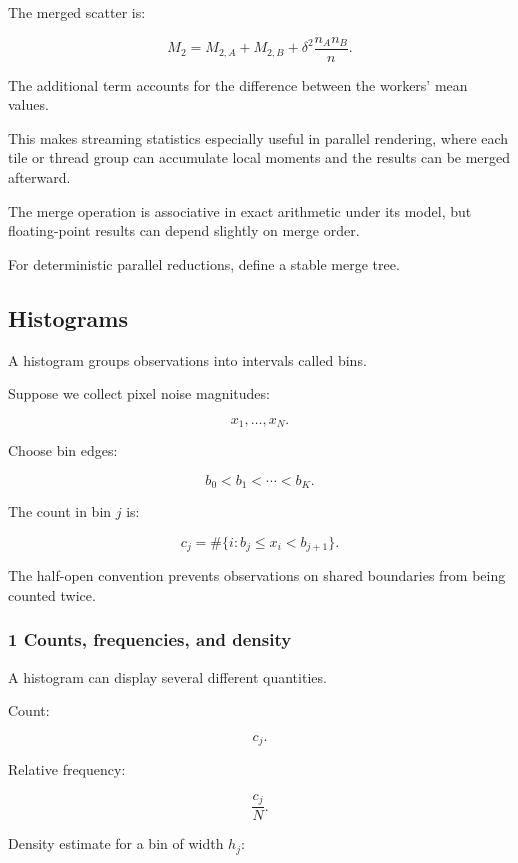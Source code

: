 The merged scatter is:

\[
 \boxed{ M_2= M_{2,A}+M_{2,B} + \delta^2\frac{n_An_B}{n} }.
\]

The additional term accounts for the difference between the workers' mean values.

This makes streaming statistics especially useful in parallel rendering, where each tile or thread group can accumulate local moments and the results can be merged afterward.

The merge operation is associative in exact arithmetic under its model, but floating-point results can depend slightly on merge order.

For deterministic parallel reductions, define a stable merge tree.

\subsection{Histograms}\label{02-foundations-ii-ch030-histograms}

\hypertarget{02-foundations-ii-ch030-histograms}{}

A histogram groups observations into intervals called bins.

Suppose we collect pixel noise magnitudes:

\[
 x_1,\ldots,x_N.
\]

Choose bin edges:

\[
 b_0<b_1<\cdots<b_K.
\]

The count in bin \(j\) is:

\[
 \boxed{ c_j= \#\{i:b_j\le x_i < b_{j+1}\} }.
\]

The half-open convention prevents observations on shared boundaries from being counted twice.

\subsubsection{1 Counts, frequencies, and density}\label{02-foundations-ii-ch030-counts-frequencies-and-density}

\hypertarget{02-foundations-ii-ch030-counts-frequencies-and-density}{}

A histogram can display several different quantities.

Count:

\[
 c_j.
\]

Relative frequency:

\[
 \frac{c_j}{N}.
\]

Density estimate for a bin of width \(h_j\):

